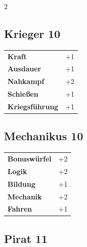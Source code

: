 \begin{multicols}{2}
\begin{tcolorbox}
    \subsection*{Krieger \hfill \small{10 }}
    \tcblower




\begin{tabular}{@{}ll@{}}
    \textbf{Kraft} & +1\\
    \textbf{Ausdauer} & +1\\
    \textbf{Nahkampf} & +2\\
    \textbf{Schießen} & +1\\
    \textbf{Kriegsführung} & +1\\
\end{tabular}


\end{tcolorbox}

\begin{tcolorbox}
    \subsection*{Mechanikus \hfill \small{10 }}
    \tcblower




\begin{tabular}{@{}ll@{}}
    \textbf{Bonuswürfel} & +2\\
    \textbf{Logik} & +2\\
    \textbf{Bildung} & +1\\
    \textbf{Mechanik} & +2\\
    \textbf{Fahren} & +1\\
\end{tabular}


\end{tcolorbox}

\begin{tcolorbox}
    \subsection*{Pirat \hfill \small{11 }}
    \tcblower





\end{tcolorbox}
\end{multicols}
